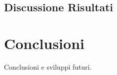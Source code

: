 \documentclass[a4paper,12pt]{report}
\begin{document}
\section{Discussione Risultati}




\chapter*{Conclusioni}
\label{Conclusioni}
Conclusioni e sviluppi futuri.



%
%



\end{document}
